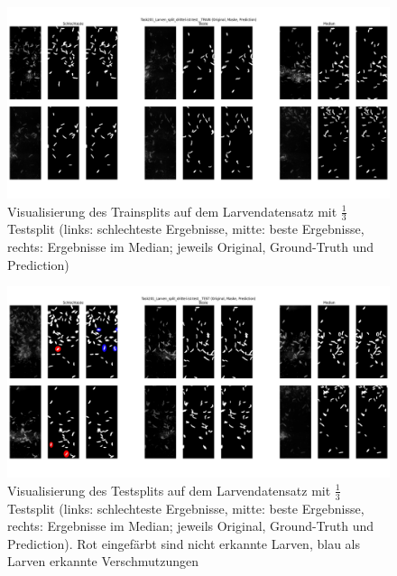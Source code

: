 \begin{figure}[H]
\centering
\includegraphics[height=0.35\textheight, width=\textwidth]{Pictures/nnUnet/Praxis/Task201-Larven-drittel-testsplit/Vis-Train.png}
\caption{Visualisierung des Trainsplits auf dem Larvendatensatz mit $\frac{1}{3}$ Testsplit (links: schlechteste Ergebnisse, mitte: beste Ergebnisse, rechts: Ergebnisse im Median; jeweils Original, Ground-Truth und Prediction)}
\label{pic:Vis-Train_201}
\end{figure}


\begin{figure}[H]
\centering
\includegraphics[height=0.35\textheight, width=\textwidth]{Pictures/nnUnet/Praxis/Task201-Larven-drittel-testsplit/Vis-Test-markiert.png}
\caption{Visualisierung des Testsplits auf dem Larvendatensatz mit $\frac{1}{3}$ Testsplit (links: schlechteste Ergebnisse, mitte: beste Ergebnisse, rechts: Ergebnisse im Median; jeweils Original, Ground-Truth und Prediction). Rot eingefärbt sind nicht erkannte Larven, blau als Larven erkannte Verschmutzungen}
\label{pic:Vis-Test_201}
\end{figure}


